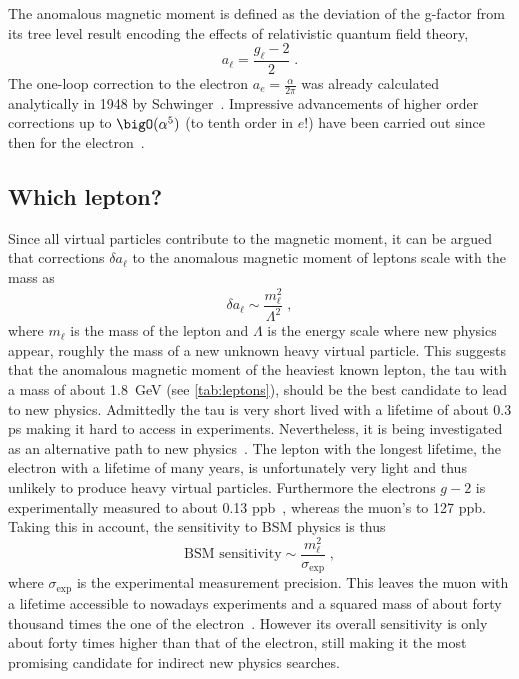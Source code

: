The anomalous magnetic moment is defined as the deviation of the g-factor from its tree level result encoding the effects of relativistic quantum field theory,
\begin{equation}
a_{\ell} = \frac{g_{\ell}-2}{2} \;.
\end{equation}
The one-loop correction to the electron $a_{e} = \frac{\alpha}{2 \pi}$ was already calculated analytically in 1948 by Schwinger~\cite{Schwinger:1948}.
Impressive advancements of higher order corrections up to $\bigO(\alpha^{5})$ (\ie to tenth order in $e$!) have been carried out since then for the electron~\cite{laporta1996analytical,PhysRevLett.109.111807,PhysRevD.91.033006,nio2015qed}.

\subsection{Which lepton?}

Since all virtual particles contribute to the magnetic moment, it can be argued~\cite{osti_4382322} that corrections $\delta a_{\ell}$ to the anomalous magnetic moment of leptons scale with the mass as
\begin{equation}
\delta a_{\ell} \sim \frac{m_{\ell}^{2}}{\Lambda^{2}} \;,
\end{equation}
where $m_{\ell}$ is the mass of the lepton and $\Lambda$ is the energy scale where new physics appear, \ie roughly the mass of a new unknown heavy virtual particle.
This suggests that the anomalous magnetic moment of the heaviest known lepton, the tau with a mass of about \SI{1.8}{\GeV} (see \cref{tab:leptons}), should be the best candidate to lead to new physics.
Admittedly the tau is very short lived with a lifetime of about \num{0.3} ps making it hard to access in experiments.
Nevertheless, it is being investigated as an alternative path to new physics~\cite{Fael:2013ij,BaBar:2015ard}.
The lepton with the longest lifetime, the electron with a lifetime of many years, is unfortunately very light and thus unlikely to produce heavy virtual particles.
Furthermore the electrons $g-2$ is experimentally measured to about \num{0.13} ppb~\cite{Fan:2022eto}, whereas the muon's to \num{127} ppb\cite{Muong-2:2025xyk}.
Taking this in account, the sensitivity to BSM physics is thus
\begin{equation}
\text{BSM sensitivity} \sim \frac{m_{\ell}^{2}}{\sigma_{\text{exp}}} \;,
\end{equation}
where $\sigma_{\text{exp}}$ is the experimental measurement precision.
This leaves the muon with a lifetime accessible to nowadays experiments and a squared mass of about forty thousand times the one of the electron~\cite{jegerlehner2009muon}.
However its overall sensitivity is only about forty times higher than that of the electron, still making it the most promising candidate for indirect new physics searches.

